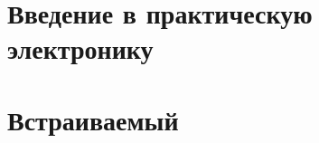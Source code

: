 

\tableofcontents\clearpage


% 
\part{Введение в практическую электронику}\label{collis}





% 
%

%

\part{Встраиваемый \emlinux}
% 
% 

% 
% 
% 
% 

% 
% 

% 

% 

% 


\printindex


